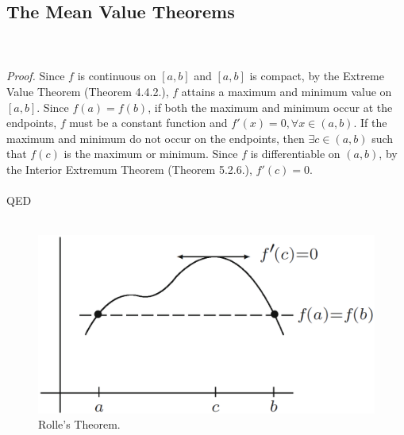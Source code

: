 \documentclass{article}
\begin{document}
            \subsection{The Mean Value Theorems}
            \\ \\
            \textit{Proof.} Since $f$ is continuous on $[a,b]$ and $[a,b]$ is compact, by the Extreme Value Theorem (Theorem 4.4.2.), $f$ attains a maximum and minimum value on $[a,b]$. Since $f(a)=f(b)$, if both the maximum and minimum occur at the endpoints, $f$ must be a constant function and $f'(x)=0, \forall x \in (a,b)$. If the maximum and minimum do not occur on the endpoints, then $\exists c \in (a,b)$ such that $f(c)$ is the maximum or minimum. Since $f$ is differentiable on $(a,b)$, by the Interior Extremum Theorem (Theorem 5.2.6.), $f'(c)=0$.
            \\ \\
            QED
            \\ \\
            \begin{figure}[ht!]
                \centering
                \includegraphics[width=0.6\linewidth]{figs/rolles_thm.png}
                \caption{Rolle's Theorem.}
                \label{rolles_thm}
            \end{figure}
\end{document}
